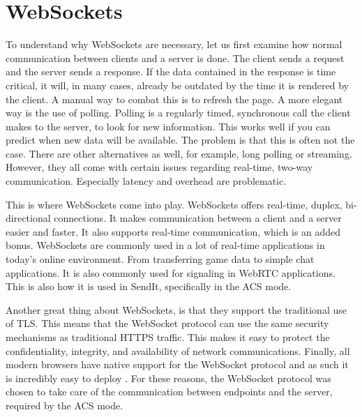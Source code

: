 \section{WebSockets}
\label{sec:ws}
%
To understand why WebSockets are necessary, let us first examine how normal communication between clients and a server is done. The client sends a request and the server sends a response. If the data contained in the response is time critical, it will, in many cases, already be outdated by the time it is rendered by the client. A manual way to combat this is to refresh the page. A more elegant way is the use of polling. Polling is a regularly timed, synchronous call the client makes to the server, to look for new information. This works well if you can predict when new data will be available. The problem is that this is often not the case. There are other alternatives as well, for example, long polling or streaming. However, they all come with certain issues regarding real-time, two-way communication. Especially latency and overhead are problematic.

This is where WebSockets come into play. WebSockets offers real-time, duplex, bi-directional connections. It makes communication between a client and a server easier and faster. It also supports real-time communication, which is an added bonus. WebSockets are commonly used in a lot of real-time applications in today's online environment. From transferring game data to simple chat applications. It is also commonly used for signaling in WebRTC applications. This is also how it is used in SendIt, specifically in the ACS mode.

Another great thing about WebSockets, is that they support the traditional use of TLS. This means that the WebSocket protocol can use the same security mechanisms as traditional HTTPS traffic. This makes it easy to protect the confidentiality, integrity, and availability of network communications. Finally, all modern browsers have native support for the WebSocket protocol and as such it is incredibly easy to deploy \cite{wangDefinitiveGuideHTML52013}. For these reasons, the WebSocket protocol was chosen to take care of the communication between endpoints and the server, required by the ACS mode.

